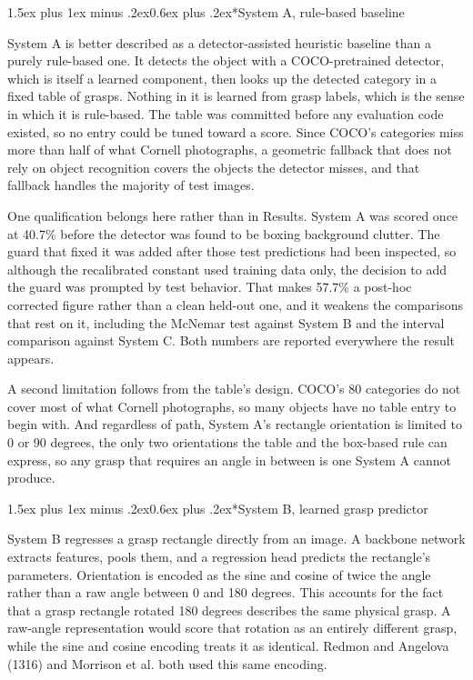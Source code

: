 \documentclass[12pt,letterpaper]{article}
\makeatletter
\renewcommand{\subsection}{\@startsection{subsection}{2}{0pt}%
  {1.5ex plus 1ex minus .2ex}{0.6ex plus .2ex}{\normalsize\itshape}}
\makeatother
\begin{document}
\subsection*{System A, rule-based baseline}

System A is better described as a detector-assisted heuristic baseline
than a purely rule-based one. It detects the object with a
COCO-pretrained detector, which is itself a learned component, then
looks up the detected category in a fixed table of grasps. Nothing in
it is learned from grasp labels, which is the sense in which it is
rule-based. The table was committed before any evaluation code existed,
so no entry could be tuned toward a score. Since COCO's categories miss
more than half of what Cornell photographs, a geometric fallback that
does not rely on object recognition covers the objects the detector
misses, and that fallback handles the majority of test images.

One qualification belongs here rather than in Results. System A was
scored once at 40.7\% before the detector was found to be boxing
background clutter. The guard that fixed it was added after those test
predictions had been inspected, so although the recalibrated constant
used training data only, the decision to add the guard was prompted by
test behavior. That makes 57.7\% a post-hoc corrected figure rather
than a clean held-out one, and it weakens the comparisons that rest on
it, including the McNemar test against System B and the interval
comparison against System C. Both numbers are reported everywhere the
result appears.

A second limitation follows from the table's design. COCO's 80
categories do not cover most of what Cornell photographs, so many
objects have no table entry to begin with. And regardless of path,
System A's rectangle orientation is limited to 0 or 90 degrees, the
only two orientations the table and the box-based rule can express, so
any grasp that requires an angle in between is one System A cannot
produce.

\subsection*{System B, learned grasp predictor}

System B regresses a grasp rectangle directly from an image. A backbone
network extracts features, pools them, and a regression head predicts
the rectangle's parameters. Orientation is encoded as the sine and
cosine of twice the angle rather than a raw angle between 0 and 180
degrees. This accounts for the fact that a grasp rectangle rotated 180
degrees describes the same physical grasp. A raw-angle representation
would score that rotation as an entirely different grasp, while the
sine and cosine encoding treats it as identical. Redmon and Angelova
(1316) and Morrison et al. both used this same encoding.
\end{document}
